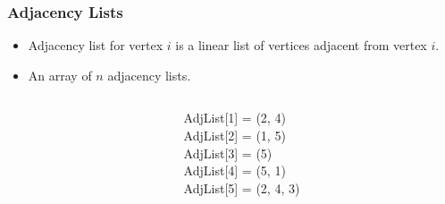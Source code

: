 \documentclass[newPxFont,sthlmFooter,nooffset]{beamer}
\begin{document}
\begin{frame}[t]
  \frametitle{Adjacency Lists}
  \begin{itemize}
  \item Adjacency list for vertex $i$ is a linear list of vertices adjacent from vertex $i$.
  \item An array of $n$ adjacency lists.
  \end{itemize}

    \begin{columns}
      \begin{column}{0.4\textwidth}
      \end{column}
      \begin{column}{0.4\textwidth}
AdjList[1] = (2, 4) \\
AdjList[2] = (1, 5) \\
AdjList[3] = (5) \\
AdjList[4] = (5, 1) \\
AdjList[5] = (2, 4, 3) \\
      \end{column}
    \end{columns}
\end{frame}
\end{document}
